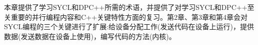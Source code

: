 本章提供了学习SYCL和DPC++所需的术语，并提供了对学习SYCL和DPC++至关重要的并行编程内容和C++关键特性方面的复习。第2章、第3章和第4章会对SYCL编程的三个关键进行了扩展:给设备分配工作(发送代码在设备上运行)，提供数据(发送数据在设备上使用)，编写代码的方法(内核)。\par